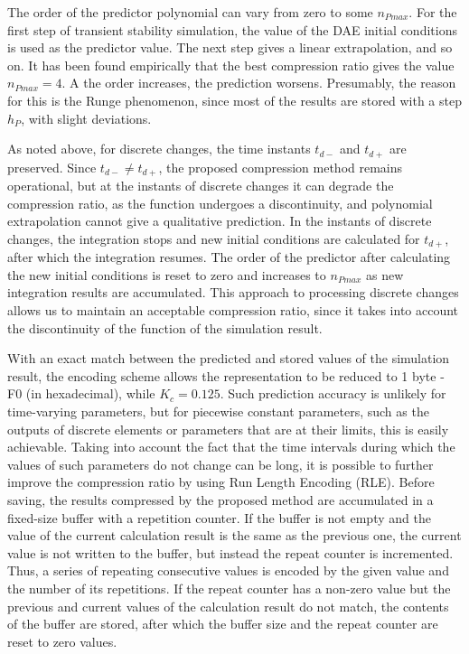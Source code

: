 \documentclass[conference]{IEEEtran}
\begin{document}
The order of the predictor polynomial can vary from zero to some \(n_{Pmax}\). For the first step of transient stability simulation, the value of the DAE
initial conditions is used as the predictor value. The next step gives a linear extrapolation, and so on. 
It has been found empirically that the best compression ratio gives the value \(n_{Pmax}=4\). A the order increases, the prediction worsens. Presumably, the reason for this is the Runge phenomenon, since most of the results are stored with a step \(h_P\), with slight deviations.

As noted above, for discrete changes, the time instants \(t_{d-}\) and \(t_{d+}\) are preserved. 
Since \(t_{d-} \neq t_{d+}\), the proposed compression method  remains operational, but at the instants of 
discrete changes it can degrade the compression ratio, as the function undergoes a discontinuity, 
and polynomial extrapolation cannot give a qualitative prediction. In the instants of discrete changes, 
the integration stops and new initial conditions are calculated for \(t_{d+}\), 
after which the integration resumes. The order of the predictor after calculating the new initial conditions is reset to zero and increases 
to \(n_{Pmax}\) as new integration results are accumulated. This approach to processing discrete changes allows us to maintain an acceptable compression ratio, since it takes into account the discontinuity of the function of the simulation result.

With an exact match between the predicted and stored values of the simulation result, the encoding scheme allows the representation to be reduced to  1 byte - F0 (in hexadecimal), while \(K_c=0.125\). Such prediction accuracy is unlikely for time-varying parameters, 
but for piecewise constant parameters, such as the outputs of discrete elements or parameters that are at their limits, this is easily achievable. 
Taking into account the fact that the time intervals during which the values of such parameters do not change can be long, 
it is possible to further improve the compression ratio by using Run Length Encoding (RLE). 
Before saving, the results compressed by the proposed method are accumulated in a fixed-size buffer with a repetition counter. 
If the buffer is not empty and the value of the current calculation result is the same as the previous one, the current value 
is not written to the buffer, but instead the repeat counter is incremented. Thus, a series of repeating consecutive values is 
encoded by the given value and the number of its repetitions.
If the repeat counter has a non-zero value but the previous and current values of the calculation result do not match, 
the contents of the buffer are stored, after which the buffer size and the repeat counter are reset to zero values.
\end{document}
